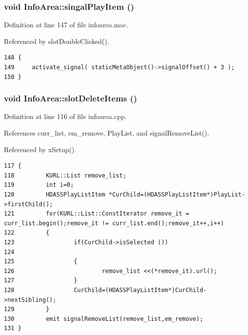 \subsubsection{\setlength{\rightskip}{0pt plus 5cm}void Info\-Area::singal\-Play\-Item ()\hspace{0.3cm}{\tt  [signal]}}\label{classInfoArea_InfoAreal3}




Definition at line 147 of file infoarea.moc.

Referenced by slot\-Double\-Clicked().



\footnotesize\begin{verbatim}148 {
149     activate_signal( staticMetaObject()->signalOffset() + 3 );
150 }
\end{verbatim}\normalsize 
{}
\subsubsection{\setlength{\rightskip}{0pt plus 5cm}void Info\-Area::slot\-Delete\-Items ()\hspace{0.3cm}{\tt  [slot]}}\label{classInfoArea_InfoAreai2}




Definition at line 116 of file infoarea.cpp.

References curr\_\-list, em\_\-remove, Play\-List, and signal\-Remove\-List().

Referenced by x\-Setup().



\footnotesize\begin{verbatim}117 {
118         KURL::List remove_list;
119         int i=0;
120         HDASSPlayListItem *CurChild=(HDASSPlayListItem*)PlayList->firstChild();
121         for(KURL::List::ConstIterator remove_it = curr_list.begin();remove_it != curr_list.end();remove_it++,i++)
122         {
123                 if(CurChild->isSelected ())
124                 
125                 {
126                         remove_list <<(*remove_it).url();
127                 }
128                 CurChild=(HDASSPlayListItem*)CurChild->nextSibling();
129         }
130         emit signalRemoveList(remove_list,em_remove);
131 }
\end{verbatim}\normalsize 
{}
